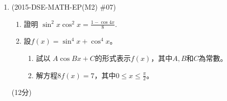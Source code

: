 \documentclass[12pt]{article}
\begin{document}
\begin{enumerate}
            \hrulefill
            
            \hrulefill
            
            \hrulefill
            
            \hrulefill
            
            \hrulefill
            
            \hrulefill
            
            \hrulefill
            
            \hrulefill
            
            \hrulefill
            
            \hrulefill
            
            \hrulefill
            
            \hrulefill
            
            \hrulefill
            
            \hrulefill

        \pagebreak
        \item (2015-DSE-MATH-EP(M2) \#07)  \begin{enumerate}
            \item 證明 $\displaystyle\sin^2{x}\cos^2{x}=\frac{1-\cos{4x}}{8}$.
            \item 設$f(x)=\sin^4{x}+\cos^4{x}$。\begin{enumerate}
                \item 試以 $A\cos{Bx}+C$的形式表示$f(x)$，其中$A,B$和$C$為常數。
                \item 解方程$8f(x)=7$，其中$0\leq x\leq \frac{\pi}{2}$。
            \end{enumerate}
        \end{enumerate}\hfill(12分)
            
            \hrulefill
            
            \hrulefill
            
            \hrulefill
            
            \hrulefill
            
            \hrulefill
            
            \hrulefill
            
            \hrulefill
            
            \hrulefill
            
            \hrulefill
            
            \hrulefill
            

\end{enumerate}
\end{document}
